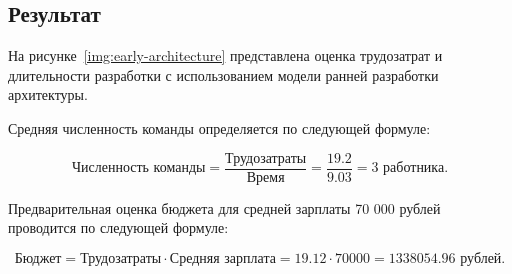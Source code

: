 \subsection{Результат}

На рисунке~\ref{img:early-architecture} представлена оценка трудозатрат и длительности разработки с использованием модели ранней разработки архитектуры.


Средняя численность команды определяется по следующей формуле:

$$\text{Численность команды} = \frac{\text{Трудозатраты}}{\text{Время}} = \frac{19.2}{9.03} = 3 \text{ работника.}$$

Предварительная оценка бюджета для средней зарплаты 70 000 рублей проводится по следующей формуле:

$$\text{Бюджет} = \text{Трудозатраты} \cdot \text{Средняя зарплата} = 19.12 \cdot 70 000 = 1 338 054.96 \text{ рублей.}$$